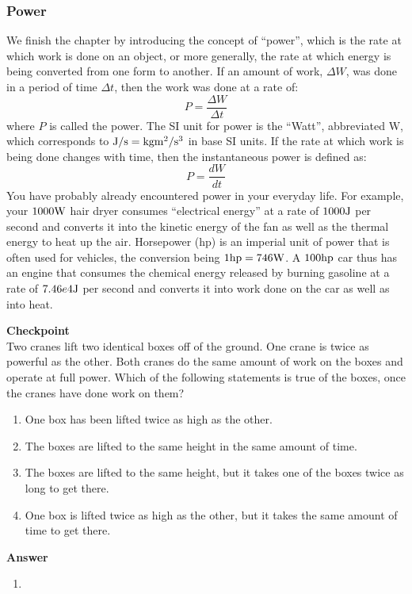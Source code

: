 \subsubsection{Power}

We finish the chapter by introducing the concept of ``power'', which is the rate at which work is done on an object, or more generally, the rate at which energy is being converted from one form to another. If an amount of work, $\Delta W$, was done in a period of time $\Delta t$, then the work was done at a rate of:
\begin{equation}
\boxed{P = \frac{\Delta W}{\Delta t}}
\end{equation}
where $P$ is called the power. The SI unit for power is the ``Watt'', abbreviated $\text{W}$, which corresponds to ${\rm J/s}={\rm kg m^2/s^3}$ in base SI units. If the rate at which work is being done changes with time, then the instantaneous power is defined as:
\begin{equation}
\boxed{P = \frac{dW}{dt}}
\end{equation}
You have probably already encountered power in your everyday life. For example, your $1000 {\rm W}$ hair dryer consumes ``electrical energy'' at a rate of $1000 {\rm J}$ per second and converts it into the kinetic energy of the fan as well as the thermal energy to heat up the air. Horsepower ($\text{hp}$) is an imperial unit of power that is often used for vehicles, the conversion being $1 {\rm hp} = 746 {\rm W}$. A $100 {\rm hp}$ car thus has an engine that consumes the chemical energy released by burning gasoline at a rate of $7.46e4 {\rm J}$ per second and converts it into work done on the car as well as into heat.

\begin{framed}
\textbf{Checkpoint}\\
Two cranes lift two identical boxes off of the ground. One crane is twice as powerful as the other. Both cranes do the same amount of work on the boxes and operate at full power. Which of the following statements is true of the boxes, once the cranes have done work on them?

\begin{enumerate}
\item One box has been lifted twice as high as the other.
\item The boxes are lifted to the same height in the same amount of time.
\item The boxes are lifted to the same height, but it takes one of the boxes twice as long to get there.
\item One box is lifted twice as high as the other, but it takes the same amount of time to get there.
\end{enumerate}

\begin{framed}
\textbf{Answer}\\
\begin{enumerate}[resume]
\item
\end{enumerate}
\end{framed}
\end{framed}

